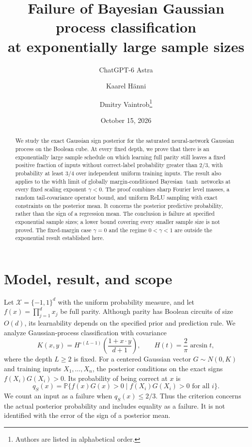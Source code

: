 \documentclass[11pt]{article}
\title{Failure of Bayesian Gaussian process classification\\at exponentially large sample sizes}
\author{ChatGPT-6 Astra \and Kaarel H\"anni \and Dmitry Vaintrob\thanks{Authors are listed in alphabetical order.}}
\date{October 15, 2026}
\theoremstyle{remark}\newtheorem{remark}[theorem]{Remark}
\begin{document}
\maketitle
\begin{abstract}
We study the exact Gaussian sign posterior for the saturated neural-network
Gaussian process on the Boolean cube. At every fixed depth, we prove that
there is an exponentially large sample schedule on which learning
full parity still leaves a fixed positive fraction of inputs without
correct-label probability greater than $2/3$, with probability at least
$3/4$ over independent uniform training inputs. The result also applies
to the width limit of globally margin-conditioned Bayesian $\tanh$
networks at every fixed scaling exponent $\gamma<0$. The proof combines
sharp Fourier level masses, a random tail-covariance operator bound,
and uniform ReLU sampling with exact constraints on the posterior mean.
It concerns the posterior predictive probability, rather than the sign
of a regression mean. The conclusion is failure at specified exponential
sample sizes; a lower bound covering every smaller sample size is not
proved. The fixed-margin case $\gamma=0$ and the regime $0<\gamma<1$
are outside the exponential result established here.
\end{abstract}

\section{Model, result, and scope}
Let $\mathcal X=\{-1,1\}^d$ with the uniform probability measure, and
let $f(x)=\prod_{j=1}^d x_j$ be full parity. Although parity has Boolean
circuits of size $O(d)$, its learnability depends on the specified prior
and prediction rule. We analyze Gaussian-process classification with
covariance
\begin{equation}\label{eq:paper-kernel}
 K(x,y)=H^{\circ(L-1)}\!\left(\frac{1+x\cdot y}{d+1}\right),
 \qquad H(t)=\frac2\pi\arcsin t,
\end{equation}
where the depth $L\ge2$ is fixed. For a centered Gaussian vector
$G\sim N(0,K)$ and training inputs $X_1,\ldots,X_n$, the posterior
conditions on the exact signs $f(X_i)G(X_i)>0$. Its probability of
being correct at $x$ is
\[
 q_S(x)=\mathbb P\{f(x)G(x)>0\mid f(X_i)G(X_i)>0\text{ for all }i\}.
\]
We count an input as a failure when $q_S(x)\le2/3$. Thus the criterion
concerns the actual posterior probability and includes equality as a
failure. It is not identified with the error of the sign of a posterior
mean.
\end{document}
